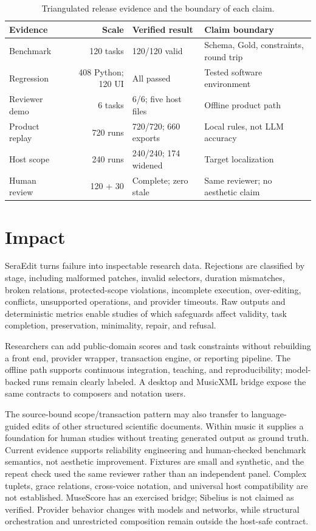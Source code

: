 \documentclass[preprint,12pt,a4paper]{elsarticle}
\begin{document}
\begin{table}[!ht]
\footnotesize
\begin{tabularx}{\textwidth}{@{}l r X X@{}}
\toprule
Evidence & Scale & Verified result & Claim boundary \\
\midrule
Benchmark & 120 tasks & 120/120 valid & Schema, Gold, constraints, round trip \\
Regression & 408 Python; 120 UI & All passed & Tested software environment \\
Reviewer demo & 6 tasks & 6/6; five host files & Offline product path \\
Product replay & 720 runs & 720/720; 660 exports & Local rules, not LLM accuracy \\
Host scope & 240 runs & 240/240; 174 widened & Target localization \\
Human review & 120 + 30 & Complete; zero stale & Same reviewer; no aesthetic claim \\
\bottomrule
\end{tabularx}
\caption{Triangulated release evidence and the boundary of each claim.}
\label{tab:evidence}
\end{table}

\section{Impact}

SeraEdit turns failure into inspectable research data. Rejections are classified by
stage, including malformed patches, invalid selectors, duration mismatches, broken
relations, protected-scope violations, incomplete execution, over-editing, conflicts,
unsupported operations, and provider timeouts. Raw outputs and deterministic metrics
enable studies of which safeguards affect validity, task completion, preservation,
minimality, repair, and refusal.

Researchers can add public-domain scores and task constraints without rebuilding a
front end, provider wrapper, transaction engine, or reporting pipeline. The offline
path supports continuous integration, teaching, and reproducibility; model-backed
runs remain clearly labeled. A desktop and MusicXML bridge expose the same contracts
to composers and notation users.

The source-bound scope/transaction pattern may also transfer to language-guided edits
of other structured scientific documents. Within music it supplies a foundation for
human studies without treating generated output as ground truth. Current evidence
supports reliability engineering and human-checked benchmark semantics, not aesthetic
improvement. Fixtures are small and synthetic, and the repeat check used the same
reviewer rather than an independent panel. Complex tuplets, grace relations, cross-voice
notation, and universal host compatibility are not established. MuseScore has an
exercised bridge; Sibelius is not claimed as verified. Provider behavior changes with
models and networks, while structural orchestration and unrestricted composition remain
outside the host-safe contract.
\end{document}
